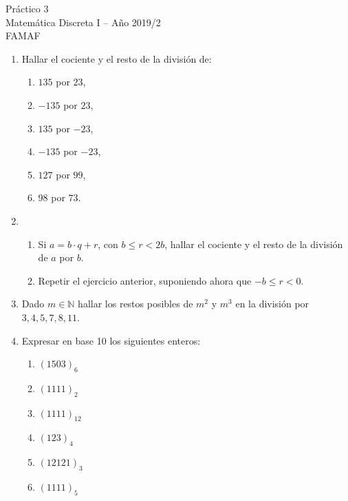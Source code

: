 \documentclass[12pt,spanish,makeidx]{amsbook}
\begin{document}
{\bf \begin{center} Práctico 3 \\ Matemática Discreta I -- Año 2019/2 \\ FAMAF \end{center}}

\smallskip


\begin{enumerate}


\smallskip

\item Hallar el cociente y el resto de la división de:

\begin{multicols}{3}
\begin{enumerate}
  \item $135$ por $23$,
	\item $-135$ por $23$,
	\item $135$ por $-23$,
  \item $-135$ por $-23$,
	\item $127$ por $99$,
	\item $98$ por $73$.
\end{enumerate}
\end{multicols}

\smallskip

\item 
\begin{enumerate}
  \item Si $a=b\cdot q+r$, con $b \le r <2 b$, hallar el cociente y el resto de la división de $a$ por $b$.
  \item Repetir el ejercicio anterior, suponiendo ahora que $-b \le r < 0$.
\end{enumerate}


\smallskip
\item Dado $m\in \mathbb N$ hallar los restos posibles de $m^2$ y $m^3$ en la división por $3,4,5,7,8, 11$.

\smallskip
\item Expresar en base 10 los siguientes enteros:
\begin{multicols}{3}
\begin{enumerate}
	\item $(1503)_6$ 
	\item $(1111)_2$ 
	\item $(1111)_{12}$
	\item $(123)_4$ 
	\item $(12121)_3$
	\item $(1111)_5$
\end{enumerate}
\end{multicols}


\end{enumerate}
\end{document}
